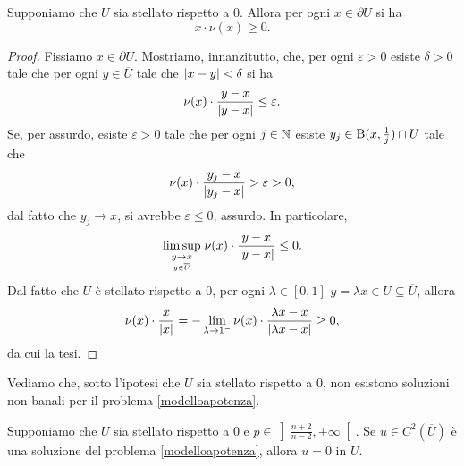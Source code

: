 \begin{lemma}\label{normaleperPohozaev}
Supponiamo che $U$ sia stellato rispetto a $0$. Allora per ogni $x \in \partial U$ si ha
\[ x \cdot \nu(x) \ge 0. \]
\end{lemma}
\begin{proof}
Fissiamo $x \in \partial U$. Mostriamo, innanzitutto, che, per ogni $\varepsilon>0$ esiste $\delta >0$ tale che per ogni $y \in \overline{U}$ tale che $\lvert x-y\rvert<\delta$ si ha 
\[ \nu(x)\cdot \frac{y-x}{\lvert y-x\rvert} \le \varepsilon. \]
Se, per assurdo, esiste $\varepsilon >0$ tale che per ogni $j \in \mathbb{N}$ esiste $y_j \in \textup{B}(x, \frac{1}{j}) \cap U$ tale che
\[ \nu(x) \cdot \frac{y_j-x}{\lvert y_j -x\rvert} >\varepsilon>0, \]
dal fatto che $y_j \to x$, si avrebbe $\varepsilon \le 0$, assurdo. In particolare, 
\[ \underset{\underset{y \in \overline{U}}{y \to x}}{\limsup}\; \nu(x)\cdot \frac{y-x}{\lvert y-x\rvert} \le 0.  \]
Dal fatto che $U$ è stellato rispetto a $0$, per ogni $\lambda \in [0,1]$ $y = \lambda x \in U \subseteq \overline{U}$, allora
\[ \nu(x) \cdot \frac{x}{\lvert x\rvert} = - \lim\limits_{\lambda \to 1^-} \nu(x) \cdot \frac{\lambda x-x}{\lvert\lambda x -x\rvert} \ge 0, \]
da cui la tesi.  
\end{proof}
Vediamo che, sotto l'ipotesi che $U$ sia stellato rispetto a $0$, non esistono soluzioni non banali per il problema \eqref{modelloapotenza}.
\begin{teorema}
Supponiamo che $U$ sia stellato rispetto a $0$ e $p \in \left] \frac{n+2}{n-2}, +\infty\right[$. Se $u \in C^2(\overline{U})$ è una soluzione del problema \eqref{modelloapotenza}, allora $u = 0$ in $U$.
\end{teorema}
